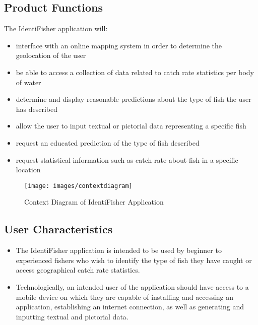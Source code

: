 \documentclass{article}
\begin{document}
\subsection{Product Functions}
The IdentiFisher application will: 
\begin{itemize}
	\item
	interface with an online mapping system in order to determine the geolocation of the user
	\item
	be able to access a collection of data related to catch rate statistics per body of water
	\item
	determine and display reasonable predictions about the type of fish the user has described
	\item
	allow the user to input textual or pictorial data representing a specific fish
	\item
	request an educated prediction of the type of fish described
	\item
	request statistical information such as catch rate about fish in a specific location
\end{itemize} 


\begin{figure}[H]
	\texttt{[image: images/contextdiagram]}
	\caption{Context Diagram of IdentiFisher Application}
\end{figure}


\subsection{User Characteristics}
\begin{itemize}
	\item
	The IdentiFisher application is intended to be used by beginner to experienced fishers who wish to identify the type of fish they have caught or access geographical catch rate statistics.

	\item
	Technologically, an intended user of the application should have access to a mobile device on which they are capable of installing and accessing an application, establishing an internet connection, as well as generating and inputting textual and pictorial data. 
\end{itemize}
\end{document}
